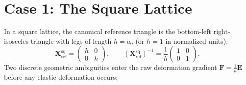 \documentclass[11pt,a4paper]{article}
\begin{document}
\section{Case 1: The Square Lattice}

In a square lattice, the canonical reference triangle is the bottom-left right-isosceles triangle with legs of length $h = a_0$ (or $h=1$ in normalized units):
\begin{equation}
  \mathbf{X}_{\text{ref}}^{\text{sq}} =
  \begin{pmatrix}
    h & 0 \\
    0 & h
  \end{pmatrix},
  \qquad
  (\mathbf{X}_{\text{ref}}^{\text{sq}})^{-1} = \frac{1}{h}
  \begin{pmatrix}
    1 & 0 \\
    0 & 1
  \end{pmatrix}.
\end{equation}
Two discrete geometric ambiguities enter the raw deformation gradient $\mathbf{F} = \frac{1}{h}\mathbf{E}$ before any elastic deformation occurs:
\end{document}
